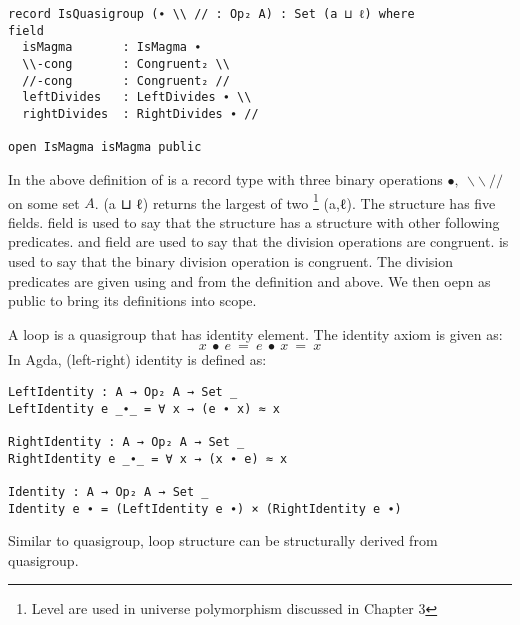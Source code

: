 \begin{verbatim}
record IsQuasigroup (∙ \\ // : Op₂ A) : Set (a ⊔ ℓ) where
field
  isMagma       : IsMagma ∙
  \\-cong       : Congruent₂ \\
  //-cong       : Congruent₂ //
  leftDivides   : LeftDivides ∙ \\
  rightDivides  : RightDivides ∙ //

open IsMagma isMagma public
\end{verbatim}
In the above definition of  is a record type with three
binary operations $∙,\ \backslash\backslash \ //$ on some set $A$. (a ⊔ ℓ)
returns the largest of two  \footnote{Level are used in universe
polymorphism discussed in Chapter 3} (a,ℓ). The structure has five fields.
 field is used to say that the structure 
has a structure  with other following predicates.
 and  field are used to say that the division
operations are congruent.  is used to say that the
binary division operation is congruent.  The division predicates are given using
 and  from the definition
 and  above. We then oepn
 as public to bring its definitions into scope.

A loop is a quasigroup that has identity element. The identity axiom is given
as:
\begin{equation}\label{eq_lineslope}
x\ ∙\ e\ =\ e\ ∙\ x\ =\ x
\end{equation}
In Agda, (left-right) identity is defined as:
\begin{verbatim}
LeftIdentity : A → Op₂ A → Set _
LeftIdentity e _∙_ = ∀ x → (e ∙ x) ≈ x

RightIdentity : A → Op₂ A → Set _
RightIdentity e _∙_ = ∀ x → (x ∙ e) ≈ x

Identity : A → Op₂ A → Set _
Identity e ∙ = (LeftIdentity e ∙) × (RightIdentity e ∙)
\end{verbatim}

Similar to quasigroup, loop structure can be structurally derived from
quasigroup.


